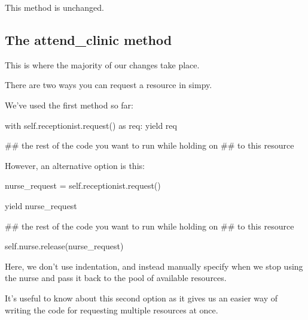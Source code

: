 \documentclass[
  letterpaper,
  DIV=11,
  numbers=noendperiod]{scrreprt}
\newenvironment{Shaded}{\begin{snugshade}}{\end{snugshade}}
\newcommand{\CommentTok}[1]{\textcolor[rgb]{0.37,0.37,0.37}{#1}}
\newcommand{\ControlFlowTok}[1]{\textcolor[rgb]{0.00,0.23,0.31}{#1}}
\newcommand{\ImportTok}[1]{\textcolor[rgb]{0.00,0.46,0.62}{#1}}
\newcommand{\NormalTok}[1]{\textcolor[rgb]{0.00,0.23,0.31}{#1}}
\newcommand{\OperatorTok}[1]{\textcolor[rgb]{0.37,0.37,0.37}{#1}}
\newcommand{\VariableTok}[1]{\textcolor[rgb]{0.07,0.07,0.07}{#1}}
\begin{document}
This method is unchanged.

\subsection{The attend\_clinic method}\label{the-attend_clinic-method-5}

This is where the majority of our changes take place.

\begin{tcolorbox}[enhanced jigsaw, rightrule=.15mm, colback=white, colframe=quarto-callout-tip-color-frame, colbacktitle=quarto-callout-tip-color!10!white, toprule=.15mm, coltitle=black, opacityback=0, titlerule=0mm, bottomtitle=1mm, breakable, title=\textcolor{quarto-callout-tip-color}{\faLightbulb}\hspace{0.5em}{Tip}, opacitybacktitle=0.6, toptitle=1mm, arc=.35mm, bottomrule=.15mm, leftrule=.75mm, left=2mm]

There are two ways you can request a resource in simpy.

We've used the first method so far:

\begin{Shaded}
\begin{Highlighting}[]
\ControlFlowTok{with} \VariableTok{self}\NormalTok{.receptionist.request() }\ImportTok{as}\NormalTok{ req:}
    \ControlFlowTok{yield}\NormalTok{ req}

    \CommentTok{\#\# the rest of the code you want to run while holding on}
    \CommentTok{\#\# to this resource}
\end{Highlighting}
\end{Shaded}

However, an alternative option is this:

\begin{Shaded}
\begin{Highlighting}[]
\NormalTok{nurse\_request }\OperatorTok{=} \VariableTok{self}\NormalTok{.receptionist.request()}

\ControlFlowTok{yield}\NormalTok{ nurse\_request}

\CommentTok{\#\# the rest of the code you want to run while holding on}
\CommentTok{\#\# to this resource}

\VariableTok{self}\NormalTok{.nurse.release(nurse\_request)}
\end{Highlighting}
\end{Shaded}

Here, we don't use indentation, and instead manually specify when we
stop using the nurse and pass it back to the pool of available
resources.

It's useful to know about this second option as it gives us an easier
way of writing the code for requesting multiple resources at once.

\end{tcolorbox}
\end{document}
